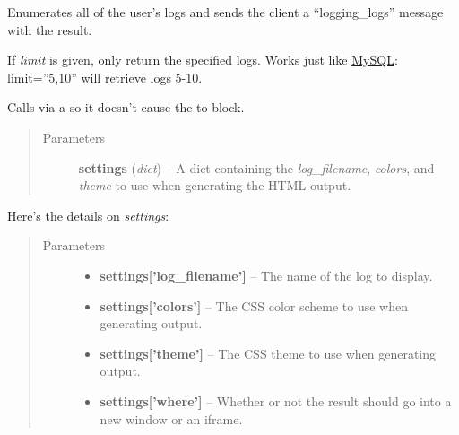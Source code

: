 \documentclass[letterpaper,10pt,openany]{sphinxmanual}
\begin{document}

\begin{fulllineitems}
\label{Applications/terminal/plugin_logging:logging_plugin._enumerate_logs}
Enumerates all of the user's logs and sends the client a ``logging\_logs''
message with the result.

If \emph{limit} is given, only return the specified logs.  Works just like
\href{http://en.wikipedia.org/wiki/MySQL}{MySQL}: limit=''5,10'' will retrieve
logs 5-10.

\end{fulllineitems}


\begin{fulllineitems}
\label{Applications/terminal/plugin_logging:logging_plugin.retrieve_log_flat}
Calls {\hyperref[Applications/terminal/plugin_logging:logging_plugin._retrieve_log_flat]{}} via a 
so it doesn't cause the  to block.
\begin{quote}\begin{description}
\item[{Parameters}] \leavevmode
\textbf{settings} (\emph{dict}) -- A dict containing the \emph{log\_filename}, \emph{colors}, and \emph{theme} to use when generating the HTML output.

\end{description}\end{quote}

Here's the details on \emph{settings}:
\begin{quote}\begin{description}
\item[{Parameters}] \leavevmode\begin{itemize}
\item {} 
\textbf{settings{[}'log\_filename'{]}} -- The name of the log to display.

\item {} 
\textbf{settings{[}'colors'{]}} -- The CSS color scheme to use when generating output.

\item {} 
\textbf{settings{[}'theme'{]}} -- The CSS theme to use when generating output.

\item {} 
\textbf{settings{[}'where'{]}} -- Whether or not the result should go into a new window or an iframe.

\end{itemize}

\end{description}\end{quote}

\end{fulllineitems}
\end{document}
